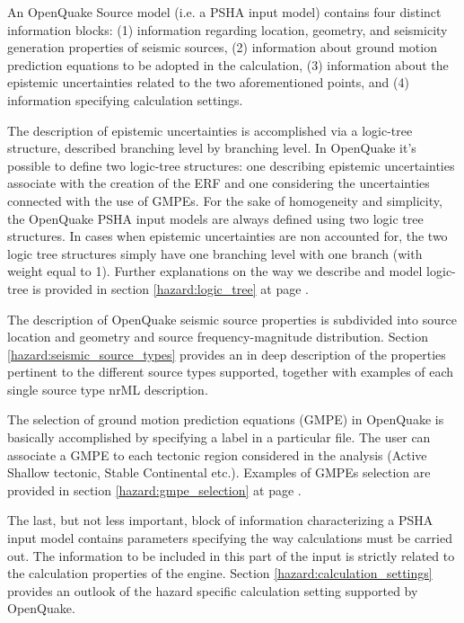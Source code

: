 An OpenQuake Source model (i.e. a PSHA input model) contains four distinct information blocks: (1) information 
regarding location, geometry, and seismicity generation properties of seismic
sources, (2) information about ground motion prediction equations to be 
adopted in the calculation, (3) information about the epistemic uncertainties 
related to the two aforementioned points, and (4) information specifying 
calculation settings.

The description of epistemic uncertainties is accomplished via a logic-tree 
structure, described branching level by branching level. In OpenQuake it's 
possible to define two logic-tree structures: one describing epistemic 
uncertainties associate with the creation of the ERF and one considering the
uncertainties connected with the use of GMPEs. For the sake of homogeneity 
and simplicity, the OpenQuake PSHA input models are always defined using two 
logic tree structures. In cases when epistemic uncertainties are non accounted
for, the two logic tree structures simply have one branching level with one 
branch (with weight equal to 1).
Further explanations on the way we describe and model logic-tree is provided 
in section \ref{hazard:logic_tree} at page \pageref{hazard:logic_tree}. 

The description of OpenQuake seismic source properties is subdivided into 
source location and geometry and source frequency-magnitude distribution. 
Section \ref{hazard:seismic_source_types} provides an in deep description of 
the properties pertinent to the different source types supported, together 
with examples of each single source type nrML description. 

The selection of ground motion prediction equations (GMPE) in OpenQuake 
is basically accomplished by specifying a label in a particular file.  
The user can associate a GMPE to each tectonic region considered in the 
analysis (Active Shallow tectonic, Stable Continental etc.). Examples of 
GMPEs selection are provided in section \ref{hazard:gmpe_selection} at page 
\pageref{hazard:gmpe_selection}.

The last, but not less important, block of information characterizing a PSHA 
input model contains parameters specifying the way calculations must be 
carried out. The information to be included in this part of the input is 
strictly related to the calculation properties of the engine. Section 
\ref{hazard:calculation_settings} provides an outlook of the hazard specific 
calculation setting supported by OpenQuake. 
%
